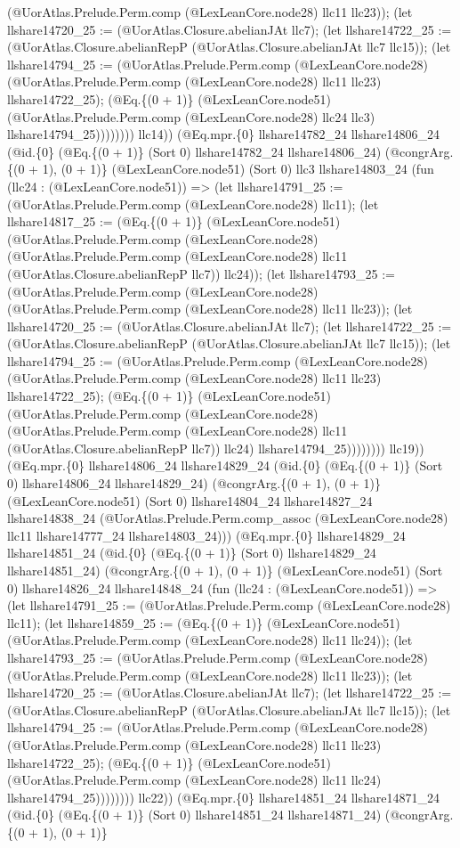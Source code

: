 \documentclass[11pt]{article}
\begin{document}
(@UorAtlas.Prelude.Perm.comp (@LexLeanCore.node28) llc11 llc23)); (let llshare14720\_25 := (@UorAtlas.Closure.abelianJAt llc7); (let llshare14722\_25 := (@UorAtlas.Closure.abelianRepP (@UorAtlas.Closure.abelianJAt llc7 llc15)); (let llshare14794\_25 := (@UorAtlas.Prelude.Perm.comp (@LexLeanCore.node28) (@UorAtlas.Prelude.Perm.comp (@LexLeanCore.node28) llc11 llc23) llshare14722\_25); (@Eq.\{(0 + 1)\} (@LexLeanCore.node51) (@UorAtlas.Prelude.Perm.comp (@LexLeanCore.node28) llc24 llc3) llshare14794\_25)))))))) llc14)) (@Eq.mpr.\{0\} llshare14782\_24 llshare14806\_24 (@id.\{0\} (@Eq.\{(0 + 1)\} (Sort 0) llshare14782\_24 llshare14806\_24) (@congrArg.\{(0 + 1), (0 + 1)\} (@LexLeanCore.node51) (Sort 0) llc3 llshare14803\_24 (fun (llc24 : (@LexLeanCore.node51)) => (let llshare14791\_25 := (@UorAtlas.Prelude.Perm.comp (@LexLeanCore.node28) llc11); (let llshare14817\_25 := (@Eq.\{(0 + 1)\} (@LexLeanCore.node51) (@UorAtlas.Prelude.Perm.comp (@LexLeanCore.node28) (@UorAtlas.Prelude.Perm.comp (@LexLeanCore.node28) llc11 (@UorAtlas.Closure.abelianRepP llc7)) llc24)); (let llshare14793\_25 := (@UorAtlas.Prelude.Perm.comp (@LexLeanCore.node28) (@UorAtlas.Prelude.Perm.comp (@LexLeanCore.node28) llc11 llc23)); (let llshare14720\_25 := (@UorAtlas.Closure.abelianJAt llc7); (let llshare14722\_25 := (@UorAtlas.Closure.abelianRepP (@UorAtlas.Closure.abelianJAt llc7 llc15)); (let llshare14794\_25 := (@UorAtlas.Prelude.Perm.comp (@LexLeanCore.node28) (@UorAtlas.Prelude.Perm.comp (@LexLeanCore.node28) llc11 llc23) llshare14722\_25); (@Eq.\{(0 + 1)\} (@LexLeanCore.node51) (@UorAtlas.Prelude.Perm.comp (@LexLeanCore.node28) (@UorAtlas.Prelude.Perm.comp (@LexLeanCore.node28) llc11 (@UorAtlas.Closure.abelianRepP llc7)) llc24) llshare14794\_25)))))))) llc19)) (@Eq.mpr.\{0\} llshare14806\_24 llshare14829\_24 (@id.\{0\} (@Eq.\{(0 + 1)\} (Sort 0) llshare14806\_24 llshare14829\_24) (@congrArg.\{(0 + 1), (0 + 1)\} (@LexLeanCore.node51) (Sort 0) llshare14804\_24 llshare14827\_24 llshare14838\_24 (@UorAtlas.Prelude.Perm.comp\_assoc (@LexLeanCore.node28) llc11 llshare14777\_24 llshare14803\_24))) (@Eq.mpr.\{0\} llshare14829\_24 llshare14851\_24 (@id.\{0\} (@Eq.\{(0 + 1)\} (Sort 0) llshare14829\_24 llshare14851\_24) (@congrArg.\{(0 + 1), (0 + 1)\} (@LexLeanCore.node51) (Sort 0) llshare14826\_24 llshare14848\_24 (fun (llc24 : (@LexLeanCore.node51)) => (let llshare14791\_25 := (@UorAtlas.Prelude.Perm.comp (@LexLeanCore.node28) llc11); (let llshare14859\_25 := (@Eq.\{(0 + 1)\} (@LexLeanCore.node51) (@UorAtlas.Prelude.Perm.comp (@LexLeanCore.node28) llc11 llc24)); (let llshare14793\_25 := (@UorAtlas.Prelude.Perm.comp (@LexLeanCore.node28) (@UorAtlas.Prelude.Perm.comp (@LexLeanCore.node28) llc11 llc23)); (let llshare14720\_25 := (@UorAtlas.Closure.abelianJAt llc7); (let llshare14722\_25 := (@UorAtlas.Closure.abelianRepP (@UorAtlas.Closure.abelianJAt llc7 llc15)); (let llshare14794\_25 := (@UorAtlas.Prelude.Perm.comp (@LexLeanCore.node28) (@UorAtlas.Prelude.Perm.comp (@LexLeanCore.node28) llc11 llc23) llshare14722\_25); (@Eq.\{(0 + 1)\} (@LexLeanCore.node51) (@UorAtlas.Prelude.Perm.comp (@LexLeanCore.node28) llc11 llc24) llshare14794\_25)))))))) llc22)) (@Eq.mpr.\{0\} llshare14851\_24 llshare14871\_24 (@id.\{0\} (@Eq.\{(0 + 1)\} (Sort 0) llshare14851\_24 llshare14871\_24) (@congrArg.\{(0 + 1), (0 + 1)\} 
\end{document}
